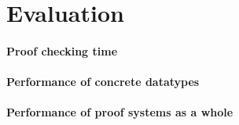 \section{Evaluation}

\paragraph{Proof checking time}

\paragraph{Performance of concrete datatypes}

\paragraph{Performance of proof systems as a whole}
